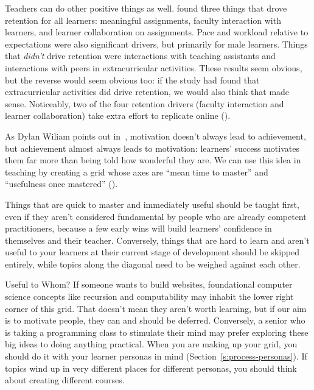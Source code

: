 Teachers can do other positive things as well.
\cite{Bark2014} found three things that drove retention for all learners:
meaningful assignments,
faculty interaction with learners,
and learner collaboration on assignments.
Pace and workload relative to expectations were also significant drivers,
but primarily for male learners.
Things that \emph{didn't} drive retention
were interactions with teaching assistants
and interactions with peers in extracurricular activities.
These results seem obvious,
but the reverse would seem obvious too:
if the study had found that extracurricular activities did drive retention,
we would also think that made sense.
Noticeably,
two of the four retention drivers (faculty interaction and learner collaboration)
take extra effort to replicate online ().


As Dylan Wiliam points out in~\cite{Hend2017},
motivation doesn't always lead to achievement,
but achievement almost always leads to motivation:
learners' success motivates them far more than being told how wonderful they are.
We can use this idea in teaching
by creating a grid whose axes are ``mean time to master''
and ``usefulness once mastered'' ().


Things that are quick to master and immediately useful should be taught first,
even if they aren't considered fundamental by people who are already competent practitioners,
because a few early wins will build learners' confidence in themselves and their teacher.
Conversely,
things that are hard to learn and aren't useful to your learners at their current stage of development
should be skipped entirely,
while topics along the diagonal need to be weighed against each other.

\newpage
\begin{aside}{Useful to Whom?}
  If someone wants to build websites,
  foundational computer science concepts like recursion and computability
  may inhabit the lower right corner of this grid.
  That doesn't mean they aren't worth learning,
  but if our aim is to motivate people,
  they can and should be deferred.
  Conversely,
  a senior who is taking a programming class to stimulate their mind
  may prefer exploring these big ideas to doing anything practical.
  When you are making up your grid,
  you should do it with your learner personas in mind
  (Section~\ref{s:process-personas}).
  If topics wind up in very different places for different personas,
  you should think about creating different courses.
\end{aside}

